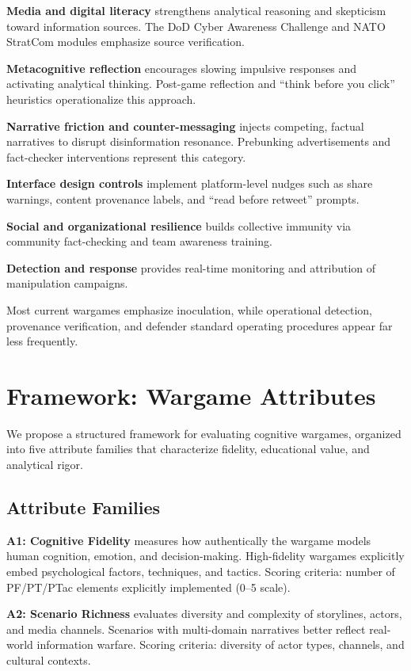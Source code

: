 \documentclass[12pt]{article}
\begin{document}
\textbf{Media and digital literacy} strengthens analytical reasoning and skepticism toward information sources. The DoD Cyber Awareness Challenge and NATO StratCom modules emphasize source verification.

\textbf{Metacognitive reflection} encourages slowing impulsive responses and activating analytical thinking. Post-game reflection and ``think before you click'' heuristics operationalize this approach.

\textbf{Narrative friction and counter-messaging} injects competing, factual narratives to disrupt disinformation resonance. Prebunking advertisements and fact-checker interventions represent this category.

\textbf{Interface design controls} implement platform-level nudges such as share warnings, content provenance labels, and ``read before retweet'' prompts.

\textbf{Social and organizational resilience} builds collective immunity via community fact-checking and team awareness training.

\textbf{Detection and response} provides real-time monitoring and attribution of manipulation campaigns.

Most current wargames emphasize inoculation, while operational detection, provenance verification, and defender standard operating procedures appear far less frequently.

\section{Framework: Wargame Attributes}

We propose a structured framework for evaluating cognitive wargames, organized into five attribute families that characterize fidelity, educational value, and analytical rigor.

\subsection{Attribute Families}

\textbf{A1: Cognitive Fidelity} measures how authentically the wargame models human cognition, emotion, and decision-making. High-fidelity wargames explicitly embed psychological factors, techniques, and tactics. Scoring criteria: number of PF/PT/PTac elements explicitly implemented (0--5 scale).

\textbf{A2: Scenario Richness} evaluates diversity and complexity of storylines, actors, and media channels. Scenarios with multi-domain narratives better reflect real-world information warfare. Scoring criteria: diversity of actor types, channels, and cultural contexts.
\end{document}
